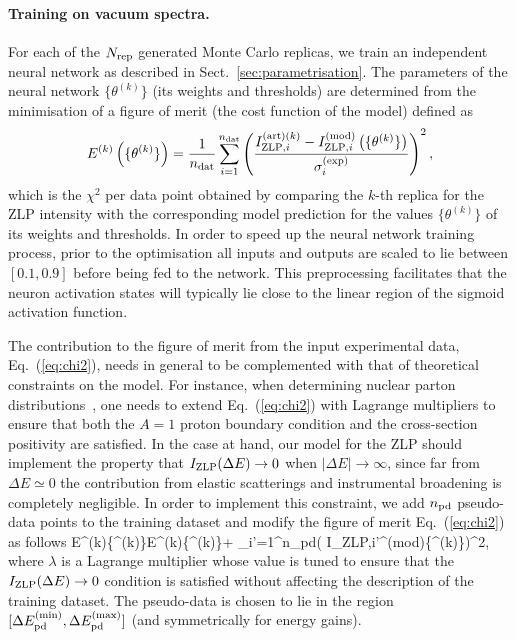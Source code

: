 \paragraph{Training on vacuum spectra.}
%
For each of the $N_{\rm rep}$ generated Monte Carlo replicas, we train an independent
neural network as described in Sect.~\ref{sec:parametrisation}.
%
The parameters of the neural network $ \{\theta^{(k)}\}$ (its weights and thresholds)
are determined from the minimisation of a figure of merit (the cost function of the model)
defined as
\begin{equation}
  \label{eq:chi2}
\begin{centering}
  E^{(k)}\lp \{\theta^{(k)}\}\rp = \frac{1}{n_{\rm dat}}\sum_{i=1}^{n_{\rm dat}}\left(\frac{ I_{{\rm ZLP},i}^{{\rm (art)}(k)} -
  I_{{\rm ZLP},i}^{{\rm (mod)}}\lp \{\theta^{(k)}\}\rp }{\sigma_i^{(\rm exp)}}\right)^2, 
\end{centering}
\end{equation}
which is the $\chi^2$ per data point obtained by comparing the $k$-th replica for the ZLP
intensity with the corresponding model prediction for the values
$\{\theta^{(k)}\}$ of its weights and thresholds.
%
In order to speed up the neural network training process, prior to the optimisation
all inputs and outputs are scaled to lie between $[0.1, 0.9]$ before
being fed to the network.
%
This preprocessing facilitates that
 the neuron activation states will typically
lie close to the linear region of the sigmoid activation function.

The contribution to the figure of merit from the input experimental data, Eq.~(\ref{eq:chi2}),
needs in general to be complemented with that of theoretical constraints on the model.
%
For instance, when determining nuclear parton distributions~\cite{AbdulKhalek:2020yuc}, one needs to
extend Eq.~(\ref{eq:chi2}) with Lagrange multipliers to ensure that both the $A=1$ proton boundary
condition and the cross-section positivity are satisfied.
%
In the case at hand, our model for the ZLP should implement the property that $I_{\rm ZLP}(\Delta E)\to 0$
when $|\Delta E| \to \infty$, since far from $\Delta E\simeq 0$ the contribution from elastic scatterings
and instrumental broadening is completely negligible.
%
In order to implement this constraint, we add $n_{\rm pd}$ pseudo-data points to the training dataset and modify
the figure of merit Eq.~(\ref{eq:chi2}) as follows
\be
\label{eq:chi2modified}
E^{(k)}\lp \{\theta^{(k)}\}\rp \to E^{(k)}\lp \{\theta^{(k)}\}\rp +
\lambda \sum_{i'=1}^{n_{\rm pd}}\left(
I_{{\rm ZLP},i'}^{{\rm (mod)}}\lp \{\theta^{(k)}\}\rp \right)^2, 
\ee
where $\lambda$ is a Lagrange multiplier whose value is tuned to ensure that the $I_{\rm ZLP}(\Delta E)\to 0$
condition
is satisfied without affecting the description of the training dataset.
%
The pseudo-data is chosen to lie in the region $[\Delta E_{\rm pd}^{\rm (min)},
  \Delta E_{\rm pd}^{\rm (max)}]$ (and symmetrically for energy gains).

